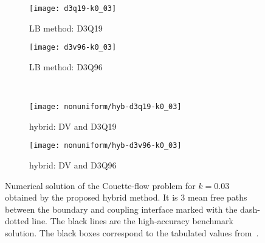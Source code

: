 \documentclass{elsarticle} %
\begin{document}
\begin{figure}
    \centering
    \begin{subfigure}[b]{0.5\textwidth}
        \texttt{[image: d3q19-k0\_03]}
        \caption{LB method: D3Q19}
        \label{fig:d3q19-k003}
    \end{subfigure}%
    \begin{subfigure}[b]{0.5\textwidth}
        \texttt{[image: d3v96-k0\_03]}
        \caption{LB method: D3Q96}
        \label{fig:d3v96-k003}
    \end{subfigure}\\
    \begin{subfigure}[b]{0.5\textwidth}
        \texttt{[image: nonuniform/hyb-d3q19-k0\_03]}
        \caption{hybrid: DV and D3Q19}
        \label{fig:hyb:d3q19-k003}
    \end{subfigure}%
    \begin{subfigure}[b]{0.5\textwidth}
        \texttt{[image: nonuniform/hyb-d3v96-k0\_03]}
        \caption{hybrid: DV and D3Q96}
        \label{fig:hyb:d3v96-k003}
    \end{subfigure}
    \caption{
        Numerical solution of the Couette-flow problem for \(k=0.03\) obtained by the proposed hybrid method.
        It is \(3\) mean free paths between the boundary and coupling interface marked with the dash-dotted line.
        The black lines are the high-accuracy benchmark solution.
        The black boxes correspond to the tabulated values from~\cite{Luo2016}.
    }\label{fig:hybrid-k003}
\end{figure}
\end{document}
